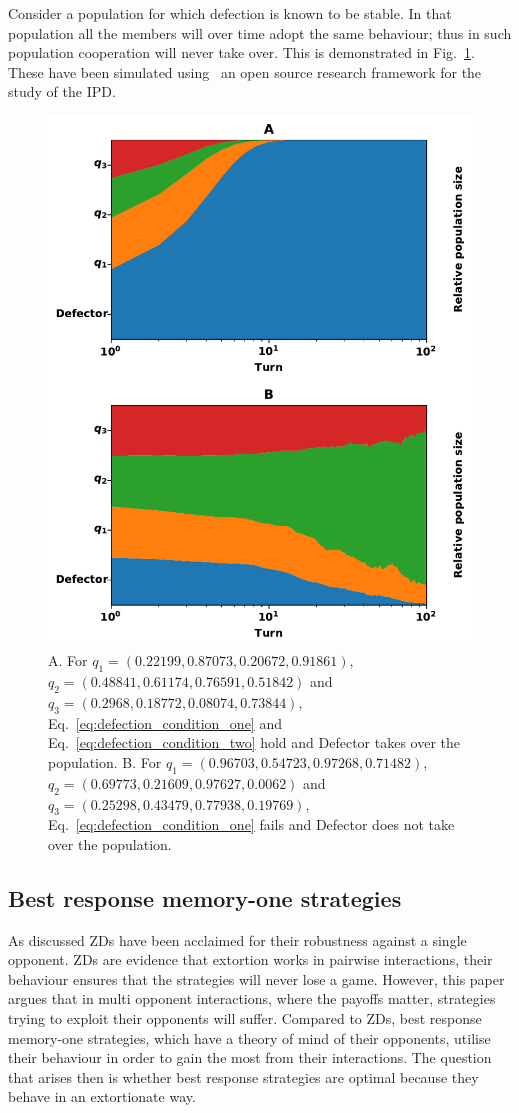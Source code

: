 \documentclass[10pt]{article}
\begin{document}
Consider a population for which defection is known to be stable. In that
population all the members will over time adopt the same behaviour; thus in such
population cooperation will never take over. This is demonstrated in
Fig.~\ref{fig:stability_of_defection}.
These have been simulated using~\cite{axelrodproject} an open
source research framework for the study of the IPD.

\begin{figure}[!htbp]
    \centering
    \includegraphics[width=.4\linewidth]{img/stability_of_defection_plots.pdf}
    \caption{A. For \(q_{1}=(0.22199, 0.87073, 0.20672, 0.91861)\),
    $q_{2}=(0.48841, 0.61174, 0.76591, 0.51842)$ and
    $q_{3}=(0.2968, 0.18772, 0.08074, 0.73844)$, Eq.~\ref{eq:defection_condition_one} and
    Eq.~\ref{eq:defection_condition_two} hold and Defector takes over the
    population. B. For $q_{1}=(0.96703, 0.54723, 0.97268, 0.71482)$,
    $q_{2}=(0.69773, 0.21609, 0.97627, 0.0062)$ and
    $q_{3}=(0.25298, 0.43479, 0.77938, 0.19769)$, Eq.~\ref{eq:defection_condition_one} fails
    and Defector does not take over the population.}\label{fig:stability_of_defection}
\end{figure}

\subsection{Best response memory-one strategies}

As discussed ZDs have been acclaimed for their robustness
against a single opponent. ZDs are evidence that extortion works
in pairwise interactions, their behaviour ensures that the strategies will never
lose a game. However, this paper argues that in multi opponent interactions,
where the payoffs matter, strategies trying to exploit their opponents will
suffer.
Compared to ZDs, best response memory-one strategies, which have a
theory of mind of their opponents, utilise their behaviour in order to gain the
most from their interactions. The question that arises then is whether best
response strategies are optimal because they behave in an extortionate way.
\end{document}
